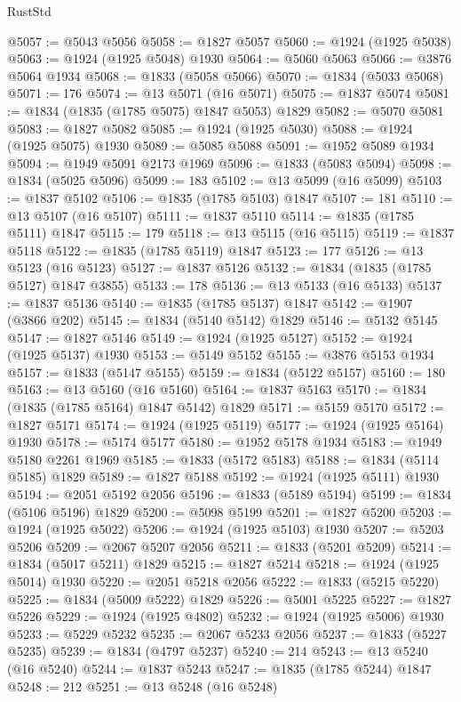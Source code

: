 \begin{lexlean}{RustStd}
\begin{coremodule}
@5057 := @5043 @5056
@5058 := @1827 @5057
@5060 := @1924 (@1925 @5038)
@5063 := @1924 (@1925 @5048) @1930
@5064 := @5060 @5063
@5066 := @3876 @5064 @1934
@5068 := @1833 (@5058 @5066)
@5070 := @1834 (@5033 @5068)
@5071 := 176
@5074 := @13 @5071 (@16 @5071)
@5075 := @1837 @5074
@5081 := @1834 (@1835 (@1785 @5075) @1847 @5053) @1829
@5082 := @5070 @5081
@5083 := @1827 @5082
@5085 := @1924 (@1925 @5030)
@5088 := @1924 (@1925 @5075) @1930
@5089 := @5085 @5088
@5091 := @1952 @5089 @1934
@5094 := @1949 @5091 @2173 @1969
@5096 := @1833 (@5083 @5094)
@5098 := @1834 (@5025 @5096)
@5099 := 183
@5102 := @13 @5099 (@16 @5099)
@5103 := @1837 @5102
@5106 := @1835 (@1785 @5103) @1847
@5107 := 181
@5110 := @13 @5107 (@16 @5107)
@5111 := @1837 @5110
@5114 := @1835 (@1785 @5111) @1847
@5115 := 179
@5118 := @13 @5115 (@16 @5115)
@5119 := @1837 @5118
@5122 := @1835 (@1785 @5119) @1847
@5123 := 177
@5126 := @13 @5123 (@16 @5123)
@5127 := @1837 @5126
@5132 := @1834 (@1835 (@1785 @5127) @1847 @3855)
@5133 := 178
@5136 := @13 @5133 (@16 @5133)
@5137 := @1837 @5136
@5140 := @1835 (@1785 @5137) @1847
@5142 := @1907 (@3866 @202)
@5145 := @1834 (@5140 @5142) @1829
@5146 := @5132 @5145
@5147 := @1827 @5146
@5149 := @1924 (@1925 @5127)
@5152 := @1924 (@1925 @5137) @1930
@5153 := @5149 @5152
@5155 := @3876 @5153 @1934
@5157 := @1833 (@5147 @5155)
@5159 := @1834 (@5122 @5157)
@5160 := 180
@5163 := @13 @5160 (@16 @5160)
@5164 := @1837 @5163
@5170 := @1834 (@1835 (@1785 @5164) @1847 @5142) @1829
@5171 := @5159 @5170
@5172 := @1827 @5171
@5174 := @1924 (@1925 @5119)
@5177 := @1924 (@1925 @5164) @1930
@5178 := @5174 @5177
@5180 := @1952 @5178 @1934
@5183 := @1949 @5180 @2261 @1969
@5185 := @1833 (@5172 @5183)
@5188 := @1834 (@5114 @5185) @1829
@5189 := @1827 @5188
@5192 := @1924 (@1925 @5111) @1930
@5194 := @2051 @5192 @2056
@5196 := @1833 (@5189 @5194)
@5199 := @1834 (@5106 @5196) @1829
@5200 := @5098 @5199
@5201 := @1827 @5200
@5203 := @1924 (@1925 @5022)
@5206 := @1924 (@1925 @5103) @1930
@5207 := @5203 @5206
@5209 := @2067 @5207 @2056
@5211 := @1833 (@5201 @5209)
@5214 := @1834 (@5017 @5211) @1829
@5215 := @1827 @5214
@5218 := @1924 (@1925 @5014) @1930
@5220 := @2051 @5218 @2056
@5222 := @1833 (@5215 @5220)
@5225 := @1834 (@5009 @5222) @1829
@5226 := @5001 @5225
@5227 := @1827 @5226
@5229 := @1924 (@1925 @4802)
@5232 := @1924 (@1925 @5006) @1930
@5233 := @5229 @5232
@5235 := @2067 @5233 @2056
@5237 := @1833 (@5227 @5235)
@5239 := @1834 (@4797 @5237)
@5240 := 214
@5243 := @13 @5240 (@16 @5240)
@5244 := @1837 @5243
@5247 := @1835 (@1785 @5244) @1847
@5248 := 212
@5251 := @13 @5248 (@16 @5248)

\end{coremodule}
\end{lexlean}
